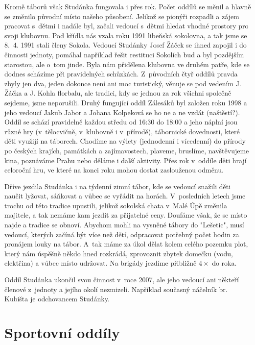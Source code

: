 \documentclass[a5paper, 11pt, twoside]{article}
\begin{document}
Kromě táborů však Studánka fungovala i přes rok. Počet oddílů se měnil a
hlavně se změnilo původní místo našeho působení. Jelikož se pionýři
rozpadli a zájem pracovat s~dětmi i nadále byl, začali vedoucí s~dětmi
hledat vhodné prostory pro svoji klubovnu. Pod křídla nás vzala roku
1991 libeňská sokolovna, a tak jsme se 8.~4. 1991 stali členy Sokola.
Vedoucí Studánky Josef Žáček se ihned zapojil i do činnosti jednoty,
pomáhal například řešit restituci Sokolích bud a byl pozdějším
starostou, ale o~tom jinde. Byla nám přidělena klubovna ve druhém patře,
kde se dodnes scházíme při pravidelných schůzkách. Z~původních čtyř
oddílů pravda zbyly jen dva, jeden dokonce není ani moc turistický,
věnuje se pod vedením J. Žáčka a J. Kohla florbalu, ale tradici, kdy se
jednou za rok všichni společně sejdeme, jsme neporušili. Druhý fungující
oddíl Zálesáků byl založen roku 1998 a jeho vedoucí Jakub Jabor a Johana
Kolpeková se ho ne a ne vzdát (naštěstí?). Oddíl se schází pravidelně
každou středu od 16:30 do 18:00 a jeho náplní jsou různé hry
(v~tělocvičně, v~klubovně i v~přírodě), tábornické dovednosti, které děti
využijí na táborech. Chodíme na výlety (jednodenní i vícedenní) do
přírody po českých krajích, památkách a zajímavostech, plaveme,
bruslíme, navštěvujeme kina, poznáváme Prahu nebo děláme i další
aktivity. Přes rok v~oddíle děti hrají celoroční hru, ve které na konci
roku mohou dostat zaslouženou odměnu.

Dříve jezdila Studánka i na týdenní zimní tábor, kde se vedoucí snažili
děti naučit lyžovat, sáňkovat a vůbec se vyřádit na horách. V~posledních
letech jsme trochu od této tradice upustili, jelikož sokolská chata
v~Malé Úpě změnila majitele, a tak nemáme kam jezdit za přijatelné ceny.
Doufáme však, že se místo najde a tradice se obnoví. Abychom mohli na
vysněné tábory do "Lešetic", musí vedoucí, kterých začíná být více než
dětí, odpracovat potřebný počet hodin za pronájem louky na tábor. A~tak
máme za úkol dělat kolem celého pozemku plot, který nám úspěšně někdo
hned rozkrádá, zprovoznit zbytek domečku (vodu, elektřina) a vůbec místo
udržovat. Na brigády jezdíme přibližně \(4\times\) do roka.

Oddíl Studánka ukončil svou činnost v~roce 2007, ale jeho vedoucí ani
někteří členové z~jednoty a jejího okolí nezmizeli. Například současný
náčelník br. Kubišta je odchovancem Studánky.

\section{Sportovní oddíly}
\end{document}
